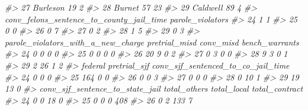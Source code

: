 \documentclass[
]{krantz}
\makeatletter
\newenvironment{Shaded}{\begin{snugshade}}{\end{snugshade}}
\newcommand{\CommentTok}[1]{\textcolor[rgb]{0.37,0.37,0.37}{\textit{#1}}}
\newenvironment{kframe}{%
\medskip{}
\setlength{\fboxsep}{.8em}
 \def\at@end@of@kframe{}%
 \ifinner\ifhmode%
  \def\at@end@of@kframe{\end{minipage}}%
  \begin{minipage}{\columnwidth}%
 \fi\fi%
 \def\FrameCommand##1{\hskip\@totalleftmargin \hskip-\fboxsep
 \colorbox{shadecolor}{##1}\hskip-\fboxsep
     \hskip-\linewidth \hskip-\@totalleftmargin \hskip\columnwidth}%
 \MakeFramed {\advance\hsize-\width
   \@totalleftmargin\z@ \linewidth\hsize
   \@setminipage}}%
 {\par\unskip\endMakeFramed%
 \at@end@of@kframe}
\renewenvironment{Shaded}{\begin{kframe}}{\end{kframe}}
\makeatother
\begin{document}
\begin{Shaded}
\begin{Highlighting}[]
\CommentTok{\#\textgreater{} 27   Burleson              19           2}
\CommentTok{\#\textgreater{} 28     Burnet              57          23}
\CommentTok{\#\textgreater{} 29   Caldwell              89           4}
\CommentTok{\#\textgreater{}    conv\_felons\_sentence\_to\_county\_jail\_time parole\_violators}
\CommentTok{\#\textgreater{} 24                                        1                1}
\CommentTok{\#\textgreater{} 25                                        0                0}
\CommentTok{\#\textgreater{} 26                                        0                7}
\CommentTok{\#\textgreater{} 27                                        0                2}
\CommentTok{\#\textgreater{} 28                                        1                5}
\CommentTok{\#\textgreater{} 29                                        0                3}
\CommentTok{\#\textgreater{}    parole\_violators\_with\_a\_new\_charge pretrial\_misd conv\_misd bench\_warrants}
\CommentTok{\#\textgreater{} 24                                  0             0         0              0}
\CommentTok{\#\textgreater{} 25                                  0             0         0              0}
\CommentTok{\#\textgreater{} 26                                 20             9         0              2}
\CommentTok{\#\textgreater{} 27                                  0             3         0              0}
\CommentTok{\#\textgreater{} 28                                  9             3         0              1}
\CommentTok{\#\textgreater{} 29                                  2            26         1              2}
\CommentTok{\#\textgreater{}    federal pretrial\_sjf conv\_sjf\_sentenced\_to\_co\_jail\_time}
\CommentTok{\#\textgreater{} 24       0            0                                  0}
\CommentTok{\#\textgreater{} 25     164            0                                  0}
\CommentTok{\#\textgreater{} 26       0            0                                  3}
\CommentTok{\#\textgreater{} 27       0            0                                  0}
\CommentTok{\#\textgreater{} 28       0           10                                  1}
\CommentTok{\#\textgreater{} 29      19           13                                  0}
\CommentTok{\#\textgreater{}    conv\_sjf\_sentence\_to\_state\_jail total\_others total\_local total\_contract}
\CommentTok{\#\textgreater{} 24                               0            0          18              0}
\CommentTok{\#\textgreater{} 25                               0            0           0            408}
\CommentTok{\#\textgreater{} 26                               0            2         133              7}

\end{Highlighting}
\end{Shaded}
\end{document}
